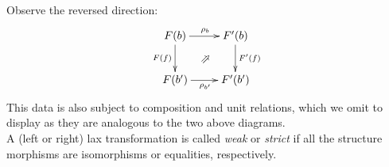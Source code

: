 \begin{defn}
      Observe the reversed direction:
      \begin{displaymath}
        \xymatrix{
          F(b)
            \ar[r]^{\rho_b}
            \ar[d]_{F(f)}
            \ar@{}[dr]|*\objectbox{\rotatebox{225}{$\Leftarrow$}}
          &
          F^\prime(b)
            \ar[d]^{F^\prime(f)}
          \\
          F(b^\prime) 
            \ar[r]_{\rho_{b^\prime}}
          &
          F^\prime(b^\prime)
        }
      \end{displaymath}
      This data is also subject to composition and unit relations, which we omit to display as they are analogous to the two above diagrams.\\
      A (left or right) lax transformation is called  \emph{weak} or \emph{strict} if all the structure morphisms are isomorphisms or equalities, respectively.
    \end{defn}

